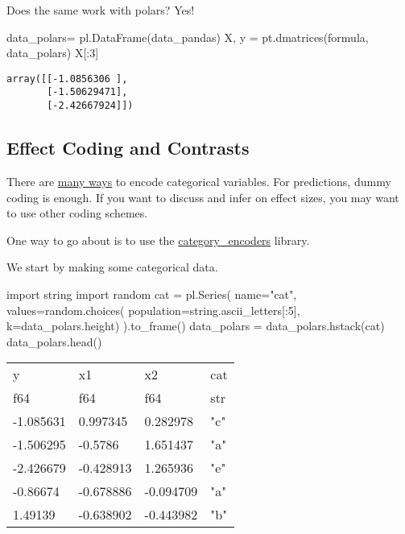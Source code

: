 \documentclass[
  letterpaper,
  DIV=11,
  numbers=noendperiod]{scrartcl}
\newenvironment{Shaded}{\begin{snugshade}}{\end{snugshade}}
\newcommand{\DecValTok}[1]{\textcolor[rgb]{0.68,0.00,0.00}{#1}}
\newcommand{\ImportTok}[1]{\textcolor[rgb]{0.00,0.46,0.62}{#1}}
\newcommand{\NormalTok}[1]{\textcolor[rgb]{0.00,0.23,0.31}{#1}}
\newcommand{\OperatorTok}[1]{\textcolor[rgb]{0.37,0.37,0.37}{#1}}
\newcommand{\StringTok}[1]{\textcolor[rgb]{0.13,0.47,0.30}{#1}}
\begin{document}
Does the same work with polars? Yes!

\begin{Shaded}
\begin{Highlighting}[]
\NormalTok{data\_polars}\OperatorTok{=}\NormalTok{ pl.DataFrame(data\_pandas)}
\NormalTok{X, y }\OperatorTok{=}\NormalTok{ pt.dmatrices(formula, data\_polars)}
\NormalTok{X[:}\DecValTok{3}\NormalTok{]}
\end{Highlighting}
\end{Shaded}

\begin{verbatim}
array([[-1.0856306 ],
       [-1.50629471],
       [-2.42667924]])
\end{verbatim}

\hypertarget{effect-coding-and-contrasts}{%
\subsection{Effect Coding and
Contrasts}\label{effect-coding-and-contrasts}}

There are
\href{https://stats.oarc.ucla.edu/spss/faq/coding-systems-for-categorical-variables-in-regression-analysis/}{many
ways} to encode categorical variables. For predictions, dummy coding is
enough. If you want to discuss and infer on effect sizes, you may want
to use other coding schemes.

One way to go about is to use the
\href{http://contrib.scikit-learn.org/category_encoders/}{category\_encoders}
library.

We start by making some categorical data.

\begin{Shaded}
\begin{Highlighting}[]
\ImportTok{import}\NormalTok{ string}
\ImportTok{import}\NormalTok{ random}
\NormalTok{cat }\OperatorTok{=}\NormalTok{ pl.Series(}
\NormalTok{    name}\OperatorTok{=}\StringTok{"cat"}\NormalTok{,}
\NormalTok{    values}\OperatorTok{=}\NormalTok{random.choices(}
\NormalTok{        population}\OperatorTok{=}\NormalTok{string.ascii\_letters[:}\DecValTok{5}\NormalTok{], }
\NormalTok{        k}\OperatorTok{=}\NormalTok{data\_polars.height)}
\NormalTok{    ).to\_frame()}
\NormalTok{data\_polars }\OperatorTok{=}\NormalTok{ data\_polars.hstack(cat)}
\NormalTok{data\_polars.head()}
\end{Highlighting}
\end{Shaded}

\begin{longtable}[]{@{}llll@{}}
\toprule()
y & x1 & x2 & cat \\
f64 & f64 & f64 & str \\
\midrule()
\endhead
-1.085631 & 0.997345 & 0.282978 & "c" \\
-1.506295 & -0.5786 & 1.651437 & "a" \\
-2.426679 & -0.428913 & 1.265936 & "e" \\
-0.86674 & -0.678886 & -0.094709 & "a" \\
1.49139 & -0.638902 & -0.443982 & "b" \\
\bottomrule()
\end{longtable}
\end{document}
